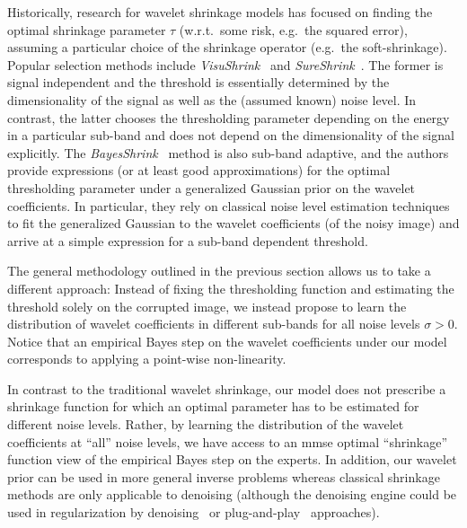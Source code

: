 Historically, research for wavelet shrinkage models has focused on finding the optimal shrinkage parameter \( \tau \) (w.r.t.\ some risk, e.g.\ the squared error), assuming a particular choice of the shrinkage operator (e.g.\ the soft-shrinkage).
Popular selection methods include \emph{VisuShrink}~\cite{donoho_ideal_1994} and \emph{SureShrink}~\cite{donoho_adapting_1995}.
The former is signal independent and the threshold is essentially determined by the dimensionality of the signal as well as the (assumed known) noise level.
In contrast, the latter chooses the thresholding parameter depending on the energy in a particular sub-band and does not depend on the dimensionality of the signal explicitly.
The \emph{BayesShrink}~\cite{chang_adaptive_2000} method is also sub-band adaptive, and the authors provide expressions (or at least good approximations) for the optimal thresholding parameter under a generalized Gaussian prior on the wavelet coefficients.
In particular, they rely on classical noise level estimation techniques to fit the generalized Gaussian to the wavelet coefficients (of the noisy image) and arrive at a simple expression for a sub-band dependent threshold.

The general methodology outlined in the previous section allows us to take a different approach:
Instead of fixing the thresholding function and estimating the threshold solely on the corrupted image, we instead propose to learn the distribution of wavelet coefficients in different sub-bands for all noise levels \( \sigma > \num{0} \).
Notice that an empirical Bayes step on the wavelet coefficients under our model corresponds to applying a point-wise non-linearity.

In contrast to the traditional wavelet shrinkage, our model does not prescribe a shrinkage function for which an optimal parameter has to be estimated for different noise levels.
Rather, by learning the distribution of the wavelet coefficients at \enquote{all} noise levels, we have access to an \gls{mmse} optimal \enquote{shrinkage} function view of the empirical Bayes step on the experts.
In addition, our wavelet prior can be used in more general inverse problems whereas classical shrinkage methods are only applicable to denoising (although the denoising engine could be used in regularization by denoising~\cite{romano_little_2017} or plug-and-play~\cite{venkatakrishnan_plug-and-play_2013} approaches).
